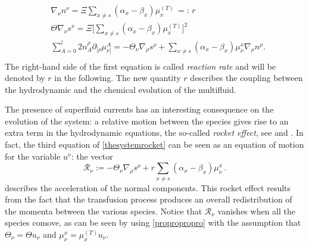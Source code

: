 \documentclass[usenatbib]{mnras}
\begin{document}
%
\begin{equation}\label{thesystemrocket}
\begin{split}
& \nabla_\nu n^\nu = \Xi \sum_{x \neq s} (\alpha_x - \beta_x) \mu_x^{(T)}  \, =: \, r\\
& \Theta \nabla_\nu s^\nu = \Xi \bigg[ \sum_{x \neq s} (\alpha_x - \beta_x ) \mu_x^{(T)}  \bigg]^2 \\
&  \sum_{A=0}^l 2n_A^\rho \partial_{[\rho}\mu^A_{\nu]} = - \Theta_\nu \nabla_\rho s^\rho + \sum_{x \neq s} (\alpha_x - \beta_x)\mu^x_\nu \nabla_\rho n^\rho. \\
\end{split}
\end{equation}
%
The right-hand side of the first equation is called \textit{reaction rate} and will be  denoted by $r$ in the following. The new quantity $r$ describes the coupling between the hydrodynamic and the chemical evolution of the multifluid. 


The presence of superfluid currents has an interesting  consequence on the evolution of the system: a relative motion between the species gives rise to  an extra term in the hydrodynamic equations, the so-called \emph{rocket effect}, see \cite{prix2004} and \cite{ColucciRocket2013}. In fact, the third equation of \eqref{thesystemrocket} can be seen as an equation of motion for the variable $u^\nu$: the vector
%
\begin{equation}
\label{rocketman}
\mathcal{R}_{\nu} :=  - \Theta_\nu \nabla_\rho s^\rho + r \sum_{x \neq s} (\alpha_x - \beta_x)\mu^x_\nu \, .
\end{equation}
%
describes the acceleration of the normal components. This rocket effect results from the fact that the 
transfusion process produces an overall redistribution of the momenta between the various species. 
Notice that $\mathcal{R}_{\nu}$ vanishes when all the species comove, as can be seen by using \eqref{propropropro} with the assumption that $\Theta_\nu = \Theta u_\nu$  and $\mu^x_\nu = \mu_x^{(T)}u_\nu$.
\end{document}
